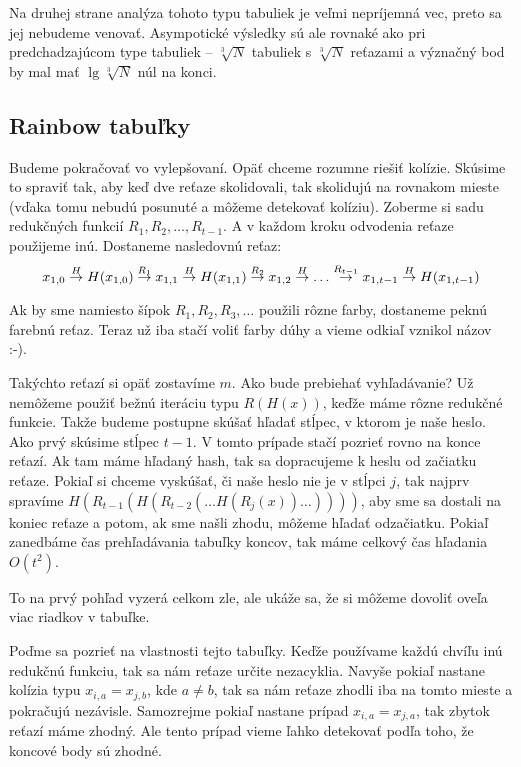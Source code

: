 Na druhej strane analýza tohoto typu tabuliek je veľmi nepríjemná vec,
preto sa jej nebudeme venovať. 
Asympotické výsledky sú ale rovnaké ako pri predchadzajúcom type tabuliek
-- $\sqrt[3]{N}$ tabuliek s $\sqrt[3]{N}$
reťazami a význačný bod by mal mať $\lg \sqrt[3]{N}$ núl na konci.

\subsection{Rainbow tabuľky}
Budeme pokračovať vo vylepšovaní.
Opäť chceme rozumne riešiť kolízie.
Skúsime to spraviť tak, aby keď dve reťaze skolidovali,
tak skolidujú na rovnakom mieste (vďaka tomu nebudú posunuté
a môžeme detekovať kolíziu). 
Zoberme si sadu redukčných funkcií $R_1, R_2, \dots, R_{t-1}$.
A v každom kroku odvodenia reťaze použijeme inú.
Dostaneme nasledovnú reťaz:
\begin{equation*}
    x_{1,0} \toa{H} H(x_{1,0}) \toa{R_1}
    x_{1,1} \toa{H} H(x_{1,1}) \toa{R_2}
    x_{1,2} \toa{H} \dots \toa{R_{t-1}}
    x_{1, t-1} \toa{H} H(x_{1,t-1})
\end{equation*}

\begin{poznamka}
    Ak by sme namiesto šípok $R_1,R_2,R_3,\dots$ použili rôzne farby,
    dostaneme peknú farebnú reťaz. Teraz už iba stačí voliť farby dúhy
    a vieme odkiaľ vznikol názov :-).
\end{poznamka}

Takýchto reťazí si opäť zostavíme $m$. Ako bude prebiehať vyhľadávanie? 
Už nemôžeme použiť bežnú iteráciu typu $R(H(x))$,
keďže máme rôzne redukčné funkcie.
Takže budeme postupne skúšať hľadať stĺpec, v ktorom je naše heslo.
Ako prvý skúsime stĺpec $t-1$.
V tomto prípade stačí pozrieť rovno na konce reťazí.
Ak tam máme hľadaný hash, tak sa dopracujeme k heslu od začiatku
reťaze.
Pokiaľ si chceme vyskúšať, či naše heslo nie je v stĺpci $j$,
tak najprv spravíme $H(R_{t-1}(H(R_{t-2}(\dots H(R_j(x))\dots))))$,
aby sme sa dostali na koniec reťaze a potom, ak sme našli zhodu,
môžeme hľadať odzačiatku.
Pokiaľ zanedbáme čas prehľadávania tabuľky koncov,
tak máme celkový čas hľadania $O(t^2)$. 

To na prvý pohľad vyzerá celkom zle, ale ukáže sa,
že si môžeme dovoliť oveľa viac riadkov v tabuľke.

Poďme sa pozrieť na vlastnosti tejto tabuľky.
Keďže používame každú chvíľu inú redukčnú funkciu, tak sa nám
reťaze určite nezacyklia. Navyše pokiaľ nastane kolízia typu 
$x_{i,a} = x_{j,b}$, kde $a\neq b$, tak sa nám
reťaze zhodli iba na tomto mieste a pokračujú nezávisle.
Samozrejme pokiaľ nastane prípad $x_{i,a} = x_{j,a}$, tak
zbytok reťazí máme zhodný. Ale tento prípad vieme ľahko detekovať podľa toho,
že koncové body sú zhodné.

